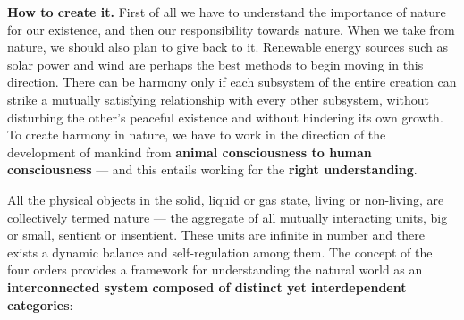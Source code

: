 \textbf{How to create it.} First of all we have to understand the importance
of nature for our existence, and then our responsibility towards nature. When
we take from nature, we should also plan to give back to it. Renewable energy
sources such as solar power and wind are perhaps the best methods to begin
moving in this direction. There can be harmony only if each subsystem of the
entire creation can strike a mutually satisfying relationship with every other
subsystem, without disturbing the other's peaceful existence and without
hindering its own growth. To create harmony in nature, we have to work in the
direction of the development of mankind from \textbf{animal consciousness to
human consciousness} --- and this entails working for the \textbf{right
understanding}.


\ans All the physical objects in the solid, liquid or gas state, living or
non-living, are collectively termed nature --- the aggregate of all mutually
interacting units, big or small, sentient or insentient. These units are
infinite in number and there exists a dynamic balance and self-regulation
among them. The concept of the four orders provides a framework for
understanding the natural world as an \textbf{interconnected system composed
of distinct yet interdependent categories}:

